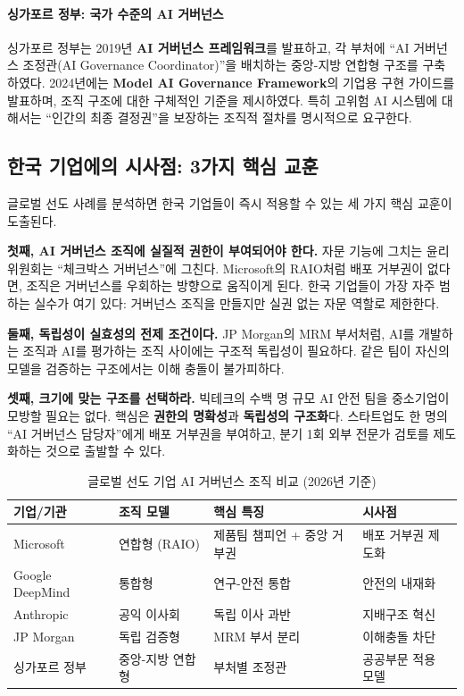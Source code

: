 \paragraph{싱가포르 정부: 국가 수준의 AI 거버넌스}
싱가포르 정부는 2019년 \textbf{AI 거버넌스 프레임워크}를 발표하고, 각 부처에 ``AI 거버넌스 조정관(AI Governance Coordinator)''을 배치하는 중앙-지방 연합형 구조를 구축하였다. 2024년에는 \textbf{Model AI Governance Framework}의 기업용 구현 가이드를 발표하며, 조직 구조에 대한 구체적인 기준을 제시하였다. 특히 고위험 AI 시스템에 대해서는 ``인간의 최종 결정권''을 보장하는 조직적 절차를 명시적으로 요구한다.

\subsection{한국 기업에의 시사점: 3가지 핵심 교훈}
\label{sec:4.4.3}

글로벌 선도 사례를 분석하면 한국 기업들이 즉시 적용할 수 있는 세 가지 핵심 교훈이 도출된다.

\textbf{첫째, AI 거버넌스 조직에 실질적 권한이 부여되어야 한다.} 자문 기능에 그치는 윤리위원회는 ``체크박스 거버넌스''에 그친다. Microsoft의 RAIO처럼 배포 거부권이 없다면, 조직은 거버넌스를 우회하는 방향으로 움직이게 된다. 한국 기업들이 가장 자주 범하는 실수가 여기 있다: 거버넌스 조직을 만들지만 실권 없는 자문 역할로 제한한다.

\textbf{둘째, 독립성이 실효성의 전제 조건이다.} JP Morgan의 MRM 부서처럼, AI를 개발하는 조직과 AI를 평가하는 조직 사이에는 구조적 독립성이 필요하다. 같은 팀이 자신의 모델을 검증하는 구조에서는 이해 충돌이 불가피하다.

\textbf{셋째, 크기에 맞는 구조를 선택하라.} 빅테크의 수백 명 규모 AI 안전 팀을 중소기업이 모방할 필요는 없다. 핵심은 \textbf{권한의 명확성}과 \textbf{독립성의 구조화}다. 스타트업도 한 명의 ``AI 거버넌스 담당자''에게 배포 거부권을 부여하고, 분기 1회 외부 전문가 검토를 제도화하는 것으로 출발할 수 있다.

\begin{table}[htbp]
\centering
\caption{글로벌 선도 기업 AI 거버넌스 조직 비교 (2026년 기준)}
\label{tab:global_ai_governance_orgs}
\begin{tabularx}{\textwidth}{|l|X|X|l|}
\hline
\textbf{기업/기관} & \textbf{조직 모델} & \textbf{핵심 특징} & \textbf{시사점} \\ \hline
Microsoft & 연합형 (RAIO) & 제품팀 챔피언 + 중앙 거부권 & 배포 거부권 제도화 \\ \hline
Google DeepMind & 통합형 & 연구-안전 통합 & 안전의 내재화 \\ \hline
Anthropic & 공익 이사회 & 독립 이사 과반 & 지배구조 혁신 \\ \hline
JP Morgan & 독립 검증형 & MRM 부서 분리 & 이해충돌 차단 \\ \hline
싱가포르 정부 & 중앙-지방 연합형 & 부처별 조정관 & 공공부문 적용 모델 \\ \hline
\end{tabularx}
\end{table}

